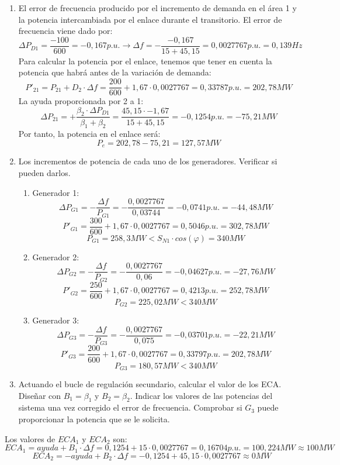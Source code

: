 \begin{enumerate}
\begin{enumerate}
	\end{enumerate}
	\item El error de frecuencia producido por el incremento de demanda en el área 1 y la potencia intercambiada por el enlace durante el transitorio.
	El error de frecuencia viene dado por:
	\[\Delta P_{D1}=\frac{-100}{600}=-0,167p.u.\rightarrow\Delta f=-\frac{-0,167}{15+45,15}=0,0027767p.u.=0,139Hz\]
	Para calcular la potencia por el enlace, tenemos que tener en cuenta la potencia que habrá antes de la variación de demanda:
	\[P'_{21}=P_{21}+D_2\cdot\Delta f=\frac{200}{600}+1,67\cdot0,0027767=0,33787p.u.=202,78MW\]
	La ayuda proporcionada por 2 a 1:
	\[\Delta P_{21}=+\frac{\beta_2\cdot\Delta P_{D1}}{\beta_1+\beta_2}=\frac{45,15\cdot-1,67}{15+45,15}=-0,1254p.u.=-75,21MW\]
	Por tanto, la potencia en el enlace será:
	\[P_e=202,78-75,21=127,57MW\]
	\item Los incrementos de potencia de cada uno de los generadores. Verificar si pueden darlos.
	\begin{enumerate}
		\item Generador 1:
		\[\Delta P_{G1}=-\frac{\Delta f}{P_{G1}}=-\frac{0,0027767}{0,03744}=-0,0741p.u.=-44,48MW\]
		\[P'_{G1}=\frac{300}{600}+1,67\cdot0,0027767=0,5046p.u.=302,78MW\]
		\[P_{G1}=258,3MW < S_{N1}\cdot cos(\varphi)=340MW\]
		\item Generador 2:
		\[\Delta P_{G2}=-\frac{\Delta f}{P_{G2}}=-\frac{0,0027767}{0,06}=-0,04627p.u.=-27,76MW\]
		\[P'_{G2}=\frac{250}{600}+1,67\cdot0,0027767=0,4213p.u.=252,78MW\]
		\[P_{G2}=225,02MW <340MW\]
		\item Generador 3:
		\[\Delta P_{G3}=-\frac{\Delta f}{P_{G3}}=-\frac{0,0027767}{0,075}=-0,03701p.u.=-22,21MW\]
		\[P'_{G3}=\frac{200}{600}+1,67\cdot0,0027767=0,33797p.u.=202,78MW\]
		\[P_{G3}=180,57MW < 340MW\]
	\end{enumerate}
	\item Actuando el bucle de regulación secundario, calcular el valor de los ECA. Diseñar con $B_1=\beta_1$ y $B_2=\beta_2$. Indicar los valores de las potencias del sistema una vez corregido el error de frecuencia. Comprobar si $G_3$ puede proporcionar la potencia que se le solicita.
\end{enumerate}
Los valores de $ECA_1$ y $ECA_2$ son:
\[ECA_1=ayuda+B_1\cdot\Delta f=0,1254+15\cdot0,0027767=0,16704p.u.=100,224MW\approx100MW\]
\[ECA_2=-ayuda+B_2\cdot\Delta f=-0,1254+45,15\cdot0,0027767\approx0MW\]


